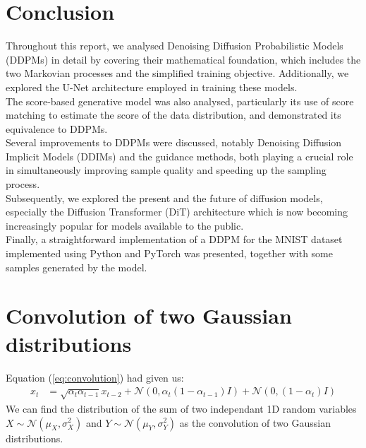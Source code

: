 \documentclass[twoside]{article}
\numberwithin{equation}{section}
\numberwithin{figure}{section}
\begin{document}
\newpage
\section{Conclusion}
Throughout this report, we analysed Denoising Diffusion Probabilistic Models (DDPMs) in detail by covering their mathematical foundation, which includes the two Markovian processes and the simplified training objective. Additionally, we explored the U-Net architecture employed in training these models. \\
The score-based generative model was also analysed, particularly its use of score matching to estimate the score of the data distribution, and demonstrated its equivalence to DDPMs. \\
Several improvements to DDPMs were discussed, notably Denoising Diffusion Implicit Models (DDIMs) and the guidance methods, both playing a crucial role in simultaneously improving sample quality and speeding up the sampling process. \\
Subsequently, we explored the present and the future of diffusion models, especially the Diffusion Transformer (DiT) architecture which is now becoming increasingly popular for models available to the public. \\
Finally, a straightforward implementation of a DDPM for the MNIST dataset implemented using Python and PyTorch was presented, together with some samples generated by the model.

\newpage
\appendix
\section{Convolution of two Gaussian distributions}\label{appendix:a}
Equation (\ref{eq:convolution}) had given us:
\begin{align*}
  x_t &= \sqrt{\alpha_t \alpha_{t-1}} x_{t-2} + \mathcal{N}\left(0, \alpha_t\left(1 - \alpha_{t-1}\right)I \right) + \mathcal{N}\left(0, (1 - \alpha_t) I \right)
\end{align*}
We can find the distribution of the sum of two independant 1D random variables $X \sim \mathcal{N}\left(\mu_X, \sigma_X^2\right)$ and $Y \sim \mathcal{N}\left(\mu_Y, \sigma_Y^2\right)$ as the convolution of two Gaussian distributions.
\end{document}

